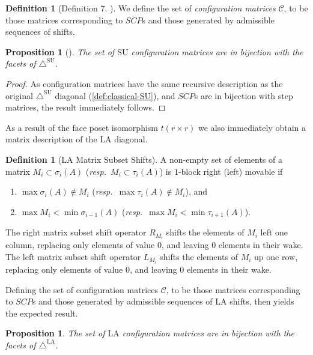 \documentclass{amsart}
\newtheorem{proposition}[theorem]{Proposition}
\theoremstyle{definition}
\newtheorem{definition}[theorem]{Definition}
\newcommand{\resp}{\textit{resp.}~} %
\newcommand{\SU}{\mathrm{SU}}
\newcommand{\LA}{\mathrm{LA}}
\newcommand{\SUD}{\triangle^{\mathrm{SU}}}
\newcommand{\LAD}{\triangle^{\mathrm{LA}}}
\begin{document}
\begin{definition}[Definition 7. \cite{SaneblidzeUmble}]
We define the set of \emph{configuration matrices} $\mathcal{C}$, to be those matrices  corresponding to $SCP$s and those generated by admissible sequences of shifts.
\end{definition}

\begin{proposition}[\cite{SaneblidzeUmble}]
The set of $\SU$ configuration matrices are in bijection with the facets of $\SUD$.
\end{proposition}
\begin{proof}
As configuration matrices have the same recursive description as the original $\SUD$ diagonal (\cref{def:classical-SU}), and $SCP$s are in bijection with step matrices, the result immediately follows.
\end{proof}

As a result of the face poset isomorphism $t(r\times r)$ we also immediately obtain a matrix description of the $\LA$ diagonal.
\begin{definition}[LA Matrix Subset Shifts]
A non-empty set of elements of a matrix $M_i \subset \sigma_i(A)$ (\resp $M_{i}\subset \tau_{i}(A)$) is $1$-block right (left) movable if
\begin{enumerate}
	\item $\max \sigma_i(A) \notin M_i$ (\resp $\max \tau_{i}(A) \notin M_i$), and
	\item $\max M_i < \min \sigma_{i-1}(A)$ (\resp $\max M_{i} < \min \tau_{i+1}(A)$).
\end{enumerate}
The right matrix subset shift operator $R_{M_i}$ shifts the elements of $M_i$ left one column, replacing only elements of value $0$, and leaving $0$ elements in their wake.
The left matrix subset shift operator $L_{M_i}$ shifts the elements of $M_i$ up one row, replacing only elements of value $0$, and leaving $0$ elements in their wake.
\end{definition}
Defining the set of configuration matrices $\mathcal{C}$, to be those matrices  corresponding to $SCP$s and those generated by admissible sequences of $\LA$ shifts, then yields the expected result.
\begin{proposition}
The set of $\LA$ configuration matrices are in bijection with the facets of $\LAD$.
\end{proposition}
\end{document}
